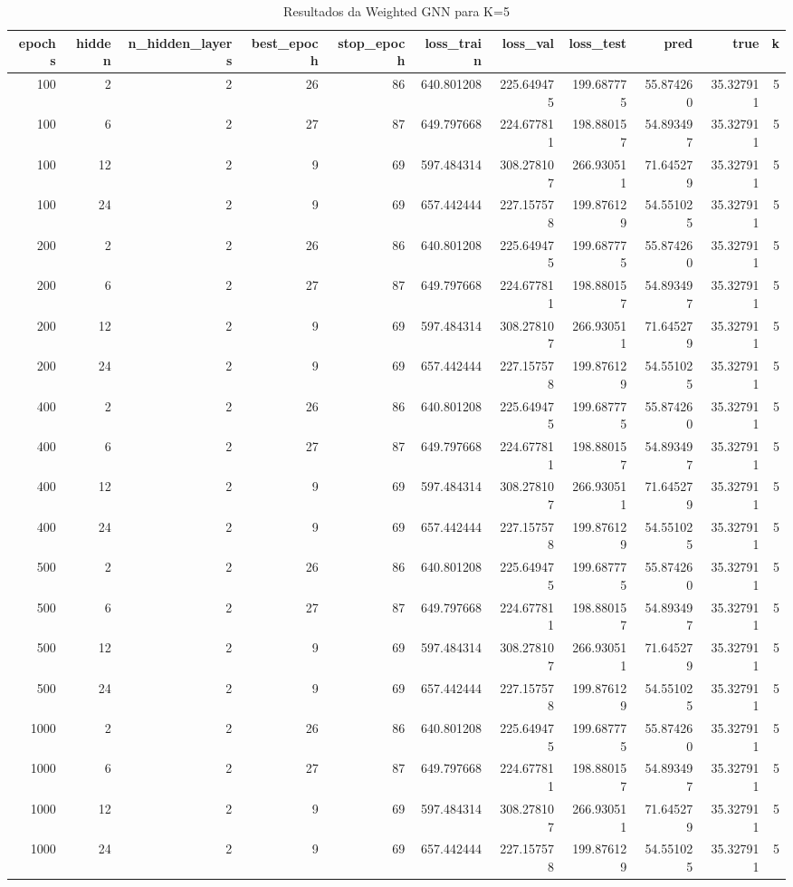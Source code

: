 \begin{table}
\caption{Resultados da Weighted GNN para K=5}
\label{tab:weighted_gnn_results_k5}
\begin{tabular}{rrrrrrrrrrr}
\toprule
epochs & hidden & n\_hidden\_layers & best\_epoch & stop\_epoch & loss\_train & loss\_val & loss\_test & pred & true & k \\
\midrule
100 & 2 & 2 & 26 & 86 & 640.801208 & 225.649475 & 199.687775 & 55.874260 & 35.327911 & 5 \\
100 & 6 & 2 & 27 & 87 & 649.797668 & 224.677811 & 198.880157 & 54.893497 & 35.327911 & 5 \\
100 & 12 & 2 & 9 & 69 & 597.484314 & 308.278107 & 266.930511 & 71.645279 & 35.327911 & 5 \\
100 & 24 & 2 & 9 & 69 & 657.442444 & 227.157578 & 199.876129 & 54.551025 & 35.327911 & 5 \\
200 & 2 & 2 & 26 & 86 & 640.801208 & 225.649475 & 199.687775 & 55.874260 & 35.327911 & 5 \\
200 & 6 & 2 & 27 & 87 & 649.797668 & 224.677811 & 198.880157 & 54.893497 & 35.327911 & 5 \\
200 & 12 & 2 & 9 & 69 & 597.484314 & 308.278107 & 266.930511 & 71.645279 & 35.327911 & 5 \\
200 & 24 & 2 & 9 & 69 & 657.442444 & 227.157578 & 199.876129 & 54.551025 & 35.327911 & 5 \\
400 & 2 & 2 & 26 & 86 & 640.801208 & 225.649475 & 199.687775 & 55.874260 & 35.327911 & 5 \\
400 & 6 & 2 & 27 & 87 & 649.797668 & 224.677811 & 198.880157 & 54.893497 & 35.327911 & 5 \\
400 & 12 & 2 & 9 & 69 & 597.484314 & 308.278107 & 266.930511 & 71.645279 & 35.327911 & 5 \\
400 & 24 & 2 & 9 & 69 & 657.442444 & 227.157578 & 199.876129 & 54.551025 & 35.327911 & 5 \\
500 & 2 & 2 & 26 & 86 & 640.801208 & 225.649475 & 199.687775 & 55.874260 & 35.327911 & 5 \\
500 & 6 & 2 & 27 & 87 & 649.797668 & 224.677811 & 198.880157 & 54.893497 & 35.327911 & 5 \\
500 & 12 & 2 & 9 & 69 & 597.484314 & 308.278107 & 266.930511 & 71.645279 & 35.327911 & 5 \\
500 & 24 & 2 & 9 & 69 & 657.442444 & 227.157578 & 199.876129 & 54.551025 & 35.327911 & 5 \\
1000 & 2 & 2 & 26 & 86 & 640.801208 & 225.649475 & 199.687775 & 55.874260 & 35.327911 & 5 \\
1000 & 6 & 2 & 27 & 87 & 649.797668 & 224.677811 & 198.880157 & 54.893497 & 35.327911 & 5 \\
1000 & 12 & 2 & 9 & 69 & 597.484314 & 308.278107 & 266.930511 & 71.645279 & 35.327911 & 5 \\
1000 & 24 & 2 & 9 & 69 & 657.442444 & 227.157578 & 199.876129 & 54.551025 & 35.327911 & 5 \\
\bottomrule
\end{tabular}
\end{table}
